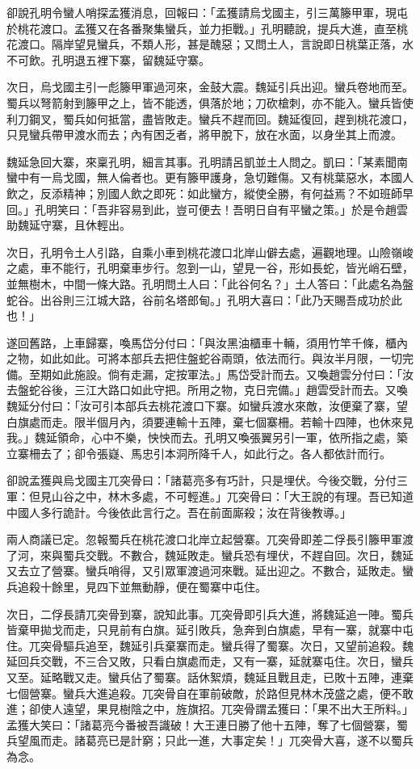 卻說孔明令蠻人哨探孟獲消息，回報曰：「孟獲請烏戈國主，引三萬籐甲軍，現屯於桃花渡口。孟獲又在各番聚集蠻兵，並力拒戰。」孔明聽說，提兵大進，直至桃花渡口。隔岸望見蠻兵，不類人形，甚是醜惡；又問土人，言說即日桃葉正落，水不可飲。孔明退五裡下寨，留魏延守寨。

次日，烏戈國主引一彪籐甲軍過河來，金鼓大震。魏延引兵出迎。蠻兵卷地而至。蜀兵以弩箭射到籐甲之上，皆不能透，俱落於地；刀砍槍刺，亦不能入。蠻兵皆使利刀鋼叉，蜀兵如何抵當，盡皆敗走。蠻兵不趕而回。魏延復回，趕到桃花渡口，只見蠻兵帶甲渡水而去；內有困乏者，將甲脫下，放在水面，以身坐其上而渡。

魏延急回大寨，來稟孔明，細言其事。孔明請呂凱並土人問之。凱曰：「某素聞南蠻中有一烏戈國，無人倫者也。更有籐甲護身，急切難傷。又有桃葉惡水，本國人飲之，反添精神；別國人飲之即死：如此蠻方，縱使全勝，有何益焉？不如班師早回。」孔明笑曰：「吾非容易到此，豈可便去！吾明日自有平蠻之策。」於是令趙雲助魏延守寨，且休輕出。

次日，孔明令土人引路，自乘小車到桃花渡口北岸山僻去處，遍觀地理。山險嶺峻之處，車不能行，孔明棄車步行。忽到一山，望見一谷，形如長蛇，皆光峭石壁，並無樹木，中間一條大路。孔明問土人曰：「此谷何名？」土人答曰：「此處名為盤蛇谷。出谷則三江城大路，谷前名塔郎甸。」孔明大喜曰：「此乃天賜吾成功於此也！」

遂回舊路，上車歸寨，喚馬岱分付曰：「與汝黑油櫃車十輛，須用竹竿千條，櫃內之物，如此如此。可將本部兵去把住盤蛇谷兩頭，依法而行。與汝半月限，一切完備。至期如此施設。倘有走漏，定按軍法。」馬岱受計而去。又喚趙雲分付曰：「汝去盤蛇谷後，三江大路口如此守把。所用之物，克日完備。」趙雲受計而去。又喚魏延分付曰：「汝可引本部兵去桃花渡口下寨。如蠻兵渡水來敵，汝便棄了寨，望白旗處而走。限半個月內，須要連輸十五陣，棄七個寨柵。若輸十四陣，也休來見我。」魏延領命，心中不樂，怏怏而去。孔明又喚張翼另引一軍，依所指之處，築立寨柵去了；卻令張嶷、馬忠引本洞所降千人，如此行之。各人都依計而行。

卻說孟獲與烏戈國主兀突骨曰：「諸葛亮多有巧計，只是埋伏。今後交戰，分付三軍：但見山谷之中，林木多處，不可輕進。」兀突骨曰：「大王說的有理。吾已知道中國人多行詭計。今後依此言行之。吾在前面廝殺；汝在背後教導。」

兩人商議已定。忽報蜀兵在桃花渡口北岸立起營寨。兀突骨即差二俘長引籐甲軍渡了河，來與蜀兵交戰。不數合，魏延敗走。蠻兵恐有埋伏，不趕自回。次日，魏延又去立了營寨。蠻兵哨得，又引眾軍渡過河來戰。延出迎之。不數合，延敗走。蠻兵追殺十餘里，見四下並無動靜，便在蜀寨中屯住。

次日，二俘長請兀突骨到寨，說知此事。兀突骨即引兵大進，將魏延追一陣。蜀兵皆棄甲拋戈而走，只見前有白旗。延引敗兵，急奔到白旗處，早有一寨，就寨中屯住。兀突骨驅兵追至，魏延引兵棄寨而走。蠻兵得了蜀寨。次日，又望前追殺。魏延回兵交戰，不三合又敗，只看白旗處而走，又有一寨，延就寨屯住。次日，蠻兵又至。延略戰又走。蠻兵佔了蜀寨。話休絮煩，魏延且戰且走，已敗十五陣，連棄七個營寨。蠻兵大進追殺。兀突骨自在軍前破敵，於路但見林木茂盛之處，便不敢進；卻使人遠望，果見樹陰之中，旌旗招。兀突骨謂孟獲曰：「果不出大王所料。」孟獲大笑曰：「諸葛亮今番被吾識破！大王連日勝了他十五陣，奪了七個營寨，蜀兵望風而走。諸葛亮已是計窮；只此一進，大事定矣！」兀突骨大喜，遂不以蜀兵為念。

